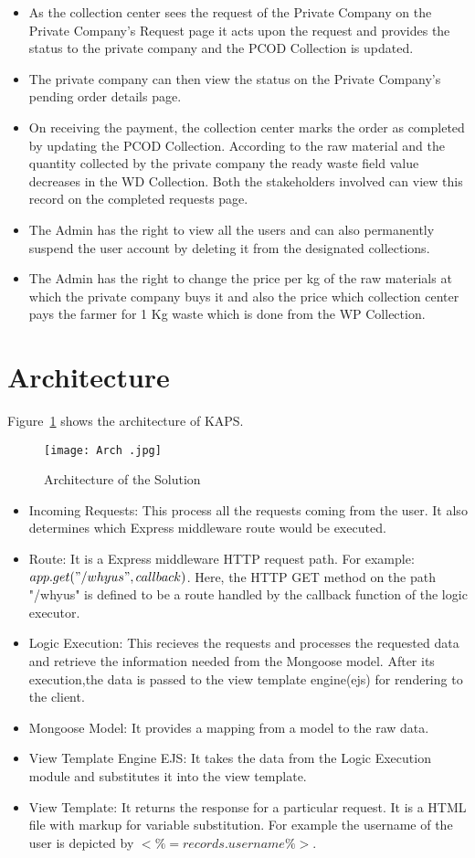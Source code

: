 \documentclass[conference]{IEEEtran}
\begin{document}
\begin{itemize}
\item As the collection center sees the request of the Private Company on the Private Company's Request page it acts upon the request and provides the status to the private company and the PCOD Collection is updated.
\item The private company can then view the status on the Private Company's pending order details page.
\item On receiving the payment, the collection center marks the order as completed by updating the PCOD Collection. According to the raw material and the quantity collected by the private company the ready waste field value decreases in the WD Collection. Both the stakeholders involved can view this record on the completed requests page.
\item The Admin has the right to view all the users and can also permanently suspend the user account by deleting it from the designated collections. 
\item The Admin has the right to change the price per kg of the raw materials at which the private company buys it and also the price which collection center pays the farmer for 1 Kg waste which is done from the WP Collection.
\end{itemize}
\section{Architecture}
Figure~\ref{fig:6} shows the architecture of KAPS.
\begin{figure}[htbp]
\centerline{\texttt{[image: Arch .jpg]}}
\caption{Architecture of the Solution}
\label{fig:6}
\end{figure}
\begin{itemize}
    \item Incoming Requests: This process all the requests coming from the user. It also determines which Express middleware route would be executed.
    \item Route: It is a Express middleware HTTP request path. For example:
    \( app.get("/whyus" ,callback) \). Here, the HTTP GET method on the path "/whyus" is defined to be a route handled by the callback function of the logic executor.
    \item Logic Execution: This recieves the requests and processes the requested data and retrieve the information needed from the Mongoose model. After its execution,the data is passed to the view template engine(ejs) for rendering to the client.
    \item Mongoose Model: It provides a mapping from a model to the raw data.
    \item View Template Engine EJS: It takes the data from the Logic Execution module and substitutes it into the view template.
    \item View Template: It returns the response for a particular request. It is a HTML file with markup for variable substitution. For example the username of the user is depicted by \(<\%=records.username \%>\).
\end{itemize}
\end{document}
